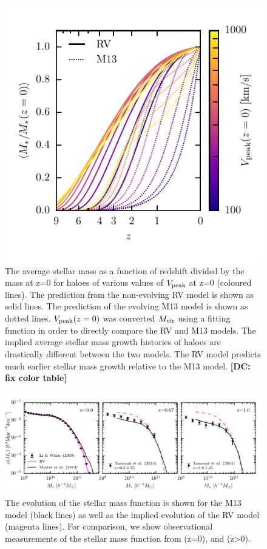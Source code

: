\documentclass[a4paper,fleqn,usenatbib]{mnras}
\begin{document}
\begin{figure}
    \includegraphics{figures/mstar_of_z_rm.pdf}
    \caption{The average stellar mass as a function of redshift divided by the mass at z=0 for haloes of various values of $V_{\rm peak}$ at z=0 (coloured lines).  The prediction from the non-evolving RV model is shown as solid lines.  The prediction of the evolving M13 model is shown as dotted lines.  $V_{\rm peak}(z=0)$ was converted $M_{\rm vir}$ using a fitting function in order to directly compare the RV and M13 models.  The implied average stellar mass growth histories of haloes are drastically different between the two models.  The RV model predicts {\rm much} earlier stellar mass growth relative to the M13 model. {\bf [DC: fix color table]}}
    \label{fig:mstar_of_z_rm}
\end{figure}

\begin{figure}
    \includegraphics{figures/stellar_mass_function_evolution.pdf}
    \caption{The evolution of the stellar mass function is shown for the M13 model (black lines) as well as the implied evolution of the RV model (magenta lines).  For comparison, we show observational measurements of the stellar mass function from  \citet{Li:2009kh} (z=0), and \citet{Tomczak2014:db} (z>0).}
    \label{fig:stellar_mass_function_evolution}
\end{figure}
\end{document}
